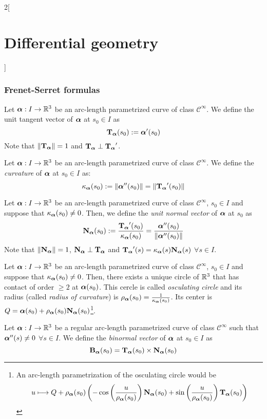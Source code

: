 \documentclass[../../../main.tex]{subfiles}
\begin{document}
\begin{multicols}{2}[\section{Differential geometry}]
  \subsubsection{Frenet-Serret formulas}
  \begin{definition}
    Let $\vf{\alpha}:I\rightarrow\RR^3$ be an arc-length parametrized curve of class $\mathcal{C}^\infty$. We define the unit tangent vector of $\vf{\alpha}$ at $s_0\in I$ as $$\T\alpha(s_0):=\vf{\alpha}'(s_0)$$ Note that $\|\T\alpha\|=1$ and $\T\alpha\perp\T\alpha'$.
  \end{definition}
  \begin{definition}
    Let $\vf{\alpha}:I\rightarrow\RR^3$ be an arc-length parametrized curve of class $\mathcal{C}^\infty$. We define the \emph{curvature} of $\vf{\alpha}$ at $s_0\in I$ as: $$\ka\alpha(s_0):=\|\vf{\alpha}''(s_0)\|=\|\T\alpha'(s_0)\|$$
  \end{definition}
  \begin{definition}
    Let $\vf{\alpha}:I\rightarrow\RR^3$ be an arc-length parametrized curve of class $\mathcal{C}^\infty$, $s_0\in I$ and suppose that $\ka\alpha(s_0)\ne 0$. Then, we define the \emph{unit normal vector} of $\vf{\alpha}$ at $s_0$ as $$\N\alpha(s_0):=\frac{\T\alpha'(s_0)}{\ka\alpha(s_0)}=\frac{\vf{\alpha}''(s_0)}{\|\vf{\alpha}''(s_0)\|}$$
    Note that $\|\N\alpha\|=1$, $\N\alpha\perp\T\alpha$ and $\T\alpha'(s)=\ka\alpha(s)\N\alpha(s)$ $\forall s\in I$.
  \end{definition}
  \begin{proposition}
    Let $\vf{\alpha}:I\rightarrow\RR^3$ be an arc-length parametrized curve of class $\mathcal{C}^\infty$, $s_0\in I$ and suppose that $\ka\alpha(s_0)\ne 0$. Then, there exists a unique circle of $\RR^3$ that has contact of order $\geq 2$ at $\vf{\alpha}(s_0)$. This cercle is called \emph{osculating circle} and its radius (called \emph{radius of curvature}) is $\rho_{\vf{\alpha}}(s_0)=\frac{1}{\ka\alpha(s_0)}$. Its center is $Q=\vf{\alpha}(s_0)+\rho_{\vf{\alpha}}(s_0)\N\alpha(s_0)$\footnote{An arc-length parametrization of the osculating circle would be $$u\longmapsto Q+\rho_{\vf{\alpha}}(s_0)\left(-\cos\left(\frac{u}{\rho_{\vf{\alpha}}(s_0)}\right)\N\alpha(s_0)+\sin\left(\frac{u}{\rho_{\vf{\alpha}}(s_0)}\right)\T\alpha(s_0)\right)$$}.
  \end{proposition}
  \begin{definition}
    Let $\vf{\alpha}:I\rightarrow\RR^3$ be a regular arc-length parametrized curve of class $\mathcal{C}^\infty$ such that $\vf{\alpha}''(s)\ne 0$ $\forall s\in I$. We define the \emph{binormal vector} of $\vf{\alpha}$ at $s_0\in I$ as $$\B\alpha(s_0)=\T\alpha(s_0)\times\N\alpha(s_0)$$

\end{definition}
\end{multicols}
\end{document}
